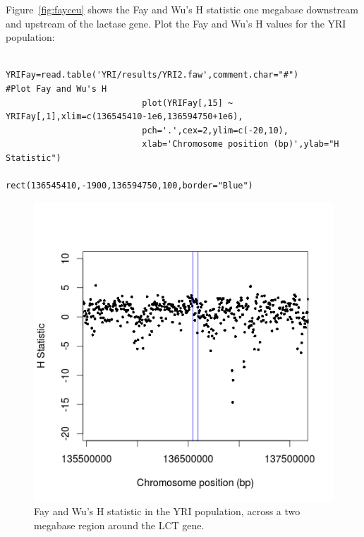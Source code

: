 \documentclass[a4paper,10pt]{article}
\begin{document}
                           \noindent
                           Figure~\ref{fig:fayceu} shows the Fay and Wu's H statistic one
                           megabase downstream and upstream of the lactase gene.  Plot the Fay
                           and Wu's H values for the YRI population:\\
                           \begin{verbatim}
                           YRIFay=read.table('YRI/results/YRI2.faw',comment.char="#")
#Plot Fay and Wu's H
                           plot(YRIFay[,15] ~ YRIFay[,1],xlim=c(136545410-1e6,136594750+1e6),
                           pch='.',cex=2,ylim=c(-20,10),
                           xlab='Chromosome position (bp)',ylab="H Statistic")
                           rect(136545410,-1900,136594750,100,border="Blue") 
                           \end{verbatim}
                           \begin{figure}
                           \centering
                           \includegraphics{pictures/YRIFay.png}
                           \caption{Fay and Wu's H statistic in the YRI population, across a two
                             megabase region around the LCT gene.} 
                             \label{fig:fayyri}
                             \end{figure}
\end{document}
